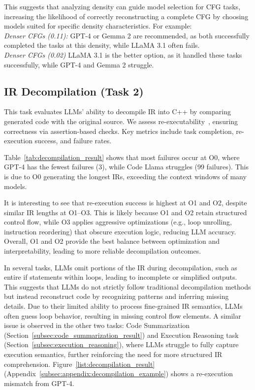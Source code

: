 This suggests that analyzing density can guide model selection for CFG tasks, increasing the likelihood of correctly reconstructing a complete CFG by choosing models suited for specific density characteristics. For example:\\
\noindent
\emph{\colorbox{red!35}{Denser CFGs (0.11):}} GPT-4 or Gemma 2 are recommended, as both successfully completed the tasks at this density, while LLaMA 3.1 often fails.\\
\noindent
\emph{\colorbox{green!35}{Denser CFGs (0.02)}} LLaMA 3.1 is the better option, as it handled these tasks successfully, while GPT-4 and Gemma 2 struggle.



\subsection{IR Decompilation (Task 2)}
\label{subsec:decompilation_results}

This task evaluates LLMs' ability to decompile IR into C++ by comparing generated code with the original source. We assess re-executability~\cite{tan2024llm4decompile, armengol2024slade, wong2023refining}, ensuring correctness via assertion-based checks. Key metrics include task completion, re-execution success, and failure rates.



Table~\ref{tab:decompilation_result} shows that most failures occur at O0, where GPT-4 has the fewest failures (3), while Code Llama struggles (99 failures). This is due to O0 generating the longest IRs, exceeding the context windows of many models.

It is interesting to see that re-execution success is highest at O1 and O2, despite similar IR lengths at O1–O3. This is likely because O1 and O2 retain structured control flow, while O3 applies aggressive optimizations (e.g., loop unrolling, instruction reordering) that obscure execution logic, reducing LLM accuracy. Overall, O1 and O2 provide the best balance between optimization and interpretability, leading to more reliable decompilation outcomes.

In several tasks, LLMs omit portions of the IR during decompilation, such as entire if statements within loops, leading to incomplete or simplified outputs. This suggests that LLMs do not strictly follow traditional decompilation methods but instead reconstruct code by recognizing patterns and inferring missing details. Due to their limited ability to process fine-grained IR semantics, LLMs often guess loop behavior, resulting in missing control flow elements. A similar issue is observed in the other two tasks: Code Summarization (Section~\ref{subsec:code_summarization_result}) and Execution Reasoning task (Section~\ref{subsec:execution_reasoning}), where LLMs struggle to fully capture execution semantics, further reinforcing the need for more structured IR comprehension.
Figure~\ref{list:decompilation_result} (Appendix~\ref{subsec:appendix:decompilation_example}) shows a re-execution mismatch from GPT-4. 

